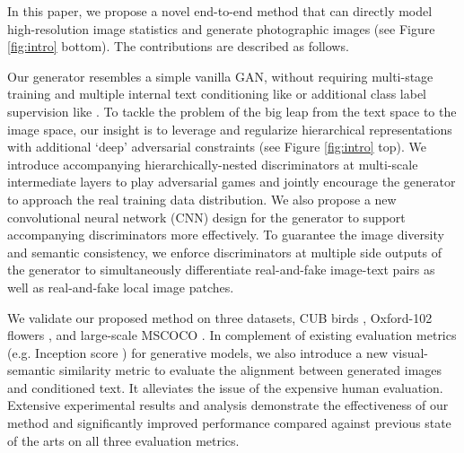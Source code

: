 \documentclass[10pt,twocolumn,letterpaper]{article}
\begin{document}
In this paper, we propose a novel end-to-end method that can directly model high-resolution image statistics and generate photographic images (see Figure \ref{fig:intro} bottom). The contributions are described as follows.

Our generator resembles a simple vanilla GAN, without requiring multi-stage training and multiple internal text conditioning like \cite{han2017stackgan} or additional class label supervision like \cite{dash2017tac}. To tackle the problem of the big leap from the text space to the image space, our insight is to leverage and regularize hierarchical representations with additional `deep' adversarial constraints (see Figure \ref{fig:intro} top). 
We introduce accompanying hierarchically-nested discriminators at multi-scale intermediate layers to play adversarial games and jointly encourage the generator to approach the real training data distribution. 
We also propose a new convolutional neural network (CNN) design for the generator to support accompanying discriminators more effectively.
To guarantee the image diversity and semantic consistency, we enforce discriminators at multiple side outputs of the generator to simultaneously differentiate real-and-fake image-text pairs as well as real-and-fake local image patches. %




We validate our proposed method on three datasets, CUB birds \cite{welinder2010caltech}, Oxford-102 flowers \cite{Nilsback08}, and large-scale MSCOCO \cite{lin2014microsoft}. In complement of existing evaluation metrics (e.g. Inception score \cite{improvedGAN}) for generative models, we also introduce a new visual-semantic similarity metric to evaluate the alignment between generated images and conditioned text. It alleviates the issue of the expensive human evaluation. Extensive experimental results and analysis demonstrate the effectiveness of our method and significantly improved performance compared against previous state of the arts on all three evaluation metrics. 
\end{document}

